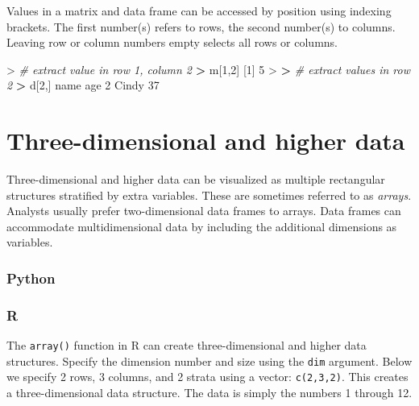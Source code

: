 \documentclass[
]{book}
\newenvironment{Shaded}{\begin{snugshade}}{\end{snugshade}}
\newcommand{\CommentTok}[1]{\textcolor[rgb]{0.56,0.35,0.01}{\textit{#1}}}
\newcommand{\DecValTok}[1]{\textcolor[rgb]{0.00,0.00,0.81}{#1}}
\newcommand{\ErrorTok}[1]{\textcolor[rgb]{0.64,0.00,0.00}{\textbf{#1}}}
\newcommand{\NormalTok}[1]{#1}
\newcommand{\SpecialCharTok}[1]{\textcolor[rgb]{0.00,0.00,0.00}{#1}}
\begin{document}
Values in a matrix and data frame can be accessed by position using indexing brackets. The first number(s) refers to rows, the second number(s) to columns. Leaving row or column numbers empty selects all rows or columns.

\begin{Shaded}
\begin{Highlighting}[]
\SpecialCharTok{\textgreater{}} \CommentTok{\# extract value in row 1, column 2}
\ErrorTok{\textgreater{}}\NormalTok{ m[}\DecValTok{1}\NormalTok{,}\DecValTok{2}\NormalTok{]}
\NormalTok{[}\DecValTok{1}\NormalTok{] }\DecValTok{5}
\SpecialCharTok{\textgreater{}} 
\ErrorTok{\textgreater{}} \CommentTok{\# extract values in row 2}
\ErrorTok{\textgreater{}}\NormalTok{ d[}\DecValTok{2}\NormalTok{,]}
\NormalTok{   name age}
\DecValTok{2}\NormalTok{ Cindy  }\DecValTok{37}
\end{Highlighting}
\end{Shaded}

\hypertarget{three-dimensional-and-higher-data}{%
\section{Three-dimensional and higher data}\label{three-dimensional-and-higher-data}}

Three-dimensional and higher data can be visualized as multiple rectangular structures stratified by extra variables. These are sometimes referred to as \emph{arrays}. Analysts usually prefer two-dimensional data frames to arrays. Data frames can accommodate multidimensional data by including the additional dimensions as variables.

\hypertarget{python-9}{%
\subsubsection*{Python}\label{python-9}}

\hypertarget{r-9}{%
\subsubsection*{R}\label{r-9}}

The \texttt{array()} function in R can create three-dimensional and higher data structures. Specify the dimension number and size using the \texttt{dim} argument. Below we specify 2 rows, 3 columns, and 2 strata using a vector: \texttt{c(2,3,2)}. This creates a three-dimensional data structure. The data is simply the numbers 1 through 12.
\end{document}
